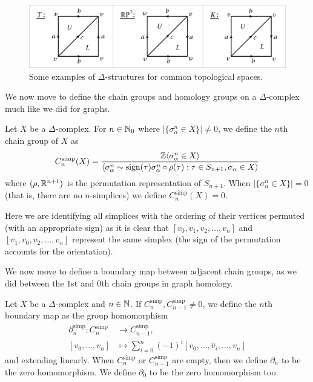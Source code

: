 \begin{figure}
  \centering
  \includegraphics[width=\textwidth]{content/images/topic-1-1.png}
  \caption{Some examples of $\Delta$-structures for common topological spaces.}
  \label{fig:delta-structures}
\end{figure}

We now move to define the chain groups and homology groups on a $\Delta$-complex much like we did for graphs.

\begin{definition}
  Let $X$ be a $\Delta$-complex. For $n \in \mathbb{N}_0$ where $\lvert \{ \sigma_\alpha^n \in X \} \rvert \neq 0$, we define the $n$th chain group of $X$ as
  \[C_n^\text{simp}(X) = \frac{\mathbb{Z}\langle \sigma_\alpha^n \in X \rangle}{\langle \sigma_\alpha^n \sim \operatorname{sign}(\tau) \sigma^n_\alpha \circ \rho(\tau): \tau \in S_{n+1}, \sigma_\alpha \in X \rangle}\]
  where $(\rho, \mathbb{R}^{n+1})$ is the permutation representation of $S_{n+1}$. When $\lvert \{ \sigma_\alpha^n \in X \} \rvert = 0$ (that is, there are no $n$-simplices) we define $C_n^\text{simp} (X) = 0$.
\end{definition}

Here we are identifying all simplices with the ordering of their vertices permuted (with an appropriate sign) as it is clear that $[v_0, v_1, v_2, \ldots, v_n]$ and $[v_1, v_0, v_2, \ldots, v_n]$ represent the same simplex (the sign of the permutation accounts for the orientation).

We now move to define a boundary map between adjacent chain groups, as we did between the $1$st and $0$th chain groups in graph homology.

\begin{definition}
  Let $X$ be a $\Delta$-complex and $n \in \mathbb{N}$. If $C_n^\text{simp}, C_{n-1}^\text{simp} \neq 0$, we define the $n$th boundary map as the group homomorphism
  \begin{align*}
    \partial_n^\text{simp}: C_n^\text{simp} & \to C_{n-1}^\text{simp},                                         \\
    [v_0, \ldots, v_n]                      & \mapsto \sum_{i=0}^n (-1)^i [v_0, \ldots, \hat v_i, \ldots, v_n]
  \end{align*}
  and extending linearly. When $C_n^\text{simp}$ or $C_{n-1}^\text{simp}$ are empty, then we define $\partial_n$ to be the zero homomorphism. We define $\partial_0$ to be the zero homomorphism too.
\end{definition}

